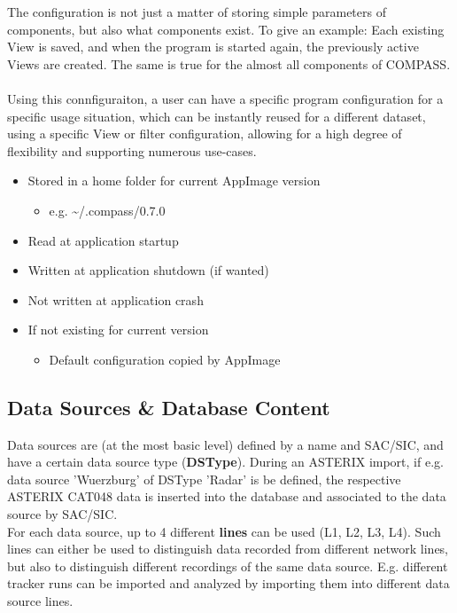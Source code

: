 The configuration is not just a matter of storing simple parameters of components, but also what components exist. To give an example: Each existing View is saved, and when the program is started again, the previously active Views are created. The same is true for the almost all components of COMPASS. \\\\

Using this connfiguraiton, a user can have a specific program configuration for a specific usage situation, which can be instantly reused for a different dataset, using a specific View or filter configuration, allowing for a high degree of flexibility and supporting numerous use-cases. \\


\begin{itemize}
\item Stored in a home folder for current AppImage version
\begin{itemize}
\item e.g. \textasciitilde/.compass/0.7.0
\end{itemize}
\item Read at application startup
\item Written at application shutdown (if wanted)
\item Not written at application crash
\item If not existing for current version
\begin{itemize}
\item Default configuration copied by AppImage
\end{itemize}
\end{itemize}

\subsection*{Data Sources \& Database Content}

Data sources are (at the most basic level) defined by a name and SAC/SIC, and have a certain data source type (\textbf{DSType}). During an ASTERIX import, if e.g. data source 'Wuerzburg' of DSType 'Radar' is be defined, the respective ASTERIX CAT048 data is inserted into the database and associated to the data source by SAC/SIC. \\

For each data source, up to 4 different \textbf{lines} can be used (L1, L2, L3, L4). Such lines can either be used to distinguish data recorded from different network lines, but also to distinguish different recordings of the same data source. E.g. different tracker runs can be imported and analyzed by importing them into different data source lines. \\

